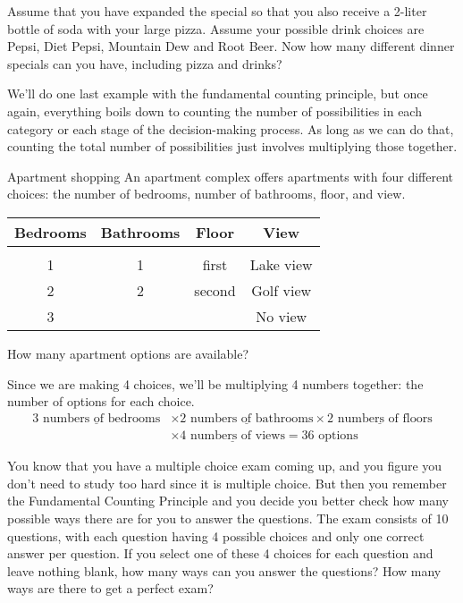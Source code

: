 \begin{try}
Assume that you have expanded the special so that you also receive a 2-liter
bottle of soda with your large pizza. Assume your possible drink choices are Pepsi, Diet
Pepsi, Mountain Dew and Root Beer. Now how many different dinner specials can you have,
including pizza and drinks?
\end{try}

We'll do one last example with the fundamental counting principle, but once again, everything boils down to counting the number of possibilities in each category or each stage of the decision-making process.  As long as we can do that, counting the total number of possibilities just involves multiplying those together.
\vfill
\pagebreak

\begin{example}[https://www.youtube.com/watch?v=oSolXixtUy0&list=PLfmpjsIzhzts14-9s5QixRje97EI2oeMF&index=28]{Apartment shopping}
An apartment complex offers apartments with four different choices: the number of bedrooms, number of bathrooms, floor, and view.
\begin{center}
\begin{tabular}{c c c c}
\textbf{Bedrooms} & \textbf{Bathrooms} & \textbf{Floor} & 	\textbf{View} \\ \hline
& & & \\
1 & 1 & first & Lake view \\ 
2 & 2 & second & Golf view \\ 
3 & & & No view\\  
\end{tabular} 
\end{center}
How many apartment options are available?

\sol
Since we are making 4 choices, we'll be multiplying 4 numbers together: the number of options for each choice.
\begin{align*}\underline{3 \textrm{ numbers of bedrooms}} &\times \underline{2 \textrm{ numbers of bathrooms}} \times \underline{2 \textrm{ numbers of floors}}\\ &\times \underline{4 \textrm{ numbers of views}} = \boxed{36 \textrm{ options}}\end{align*}
\end{example}

\begin{try}
You know that you have a multiple choice exam coming up, and you figure
you don't need to study too hard since it is multiple choice. But then you remember the
Fundamental Counting Principle and you decide you better check how many possible ways
there are for you to answer the questions. The exam consists of 10 questions, with each
question having 4 possible choices and only one correct answer per question. If you select
one of these 4 choices for each question and leave nothing blank, how many ways can you
answer the questions? How many ways are there to get a perfect exam?
\end{try}

